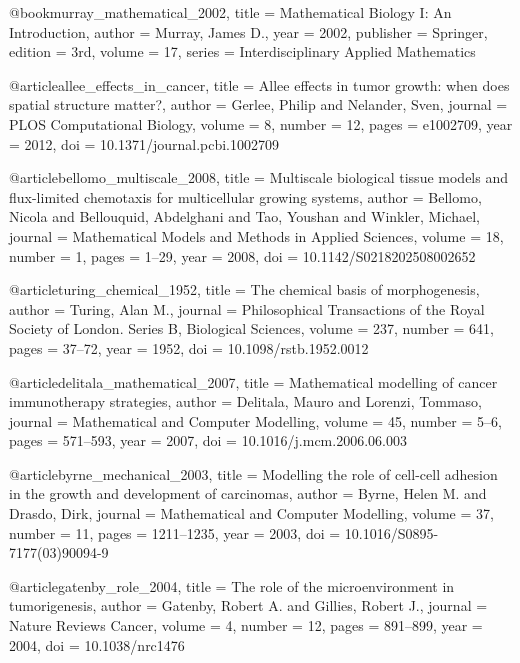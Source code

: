 @book{murray_mathematical_2002,
  title     = {Mathematical Biology I: An Introduction},
  author    = {Murray, James D.},
  year      = {2002},
  publisher = {Springer},
  edition   = {3rd},
  volume    = {17},
  series    = {Interdisciplinary Applied Mathematics}
}

@article{allee_effects_in_cancer,
  title   = {Allee effects in tumor growth: when does spatial structure matter?},
  author  = {Gerlee, Philip and Nelander, Sven},
  journal = {PLOS Computational Biology},
  volume  = {8},
  number  = {12},
  pages   = {e1002709},
  year    = {2012},
  doi     = {10.1371/journal.pcbi.1002709}
}

@article{bellomo_multiscale_2008,
  title   = {Multiscale biological tissue models and flux-limited chemotaxis for multicellular growing systems},
  author  = {Bellomo, Nicola and Bellouquid, Abdelghani and Tao, Youshan and Winkler, Michael},
  journal = {Mathematical Models and Methods in Applied Sciences},
  volume  = {18},
  number  = {1},
  pages   = {1--29},
  year    = {2008},
  doi     = {10.1142/S0218202508002652}
}

@article{turing_chemical_1952,
  title   = {The chemical basis of morphogenesis},
  author  = {Turing, Alan M.},
  journal = {Philosophical Transactions of the Royal Society of London. Series B, Biological Sciences},
  volume  = {237},
  number  = {641},
  pages   = {37--72},
  year    = {1952},
  doi     = {10.1098/rstb.1952.0012}
}

@article{delitala_mathematical_2007,
  title   = {Mathematical modelling of cancer immunotherapy strategies},
  author  = {Delitala, Mauro and Lorenzi, Tommaso},
  journal = {Mathematical and Computer Modelling},
  volume  = {45},
  number  = {5--6},
  pages   = {571--593},
  year    = {2007},
  doi     = {10.1016/j.mcm.2006.06.003}
}

@article{byrne_mechanical_2003,
  title   = {Modelling the role of cell-cell adhesion in the growth and development of carcinomas},
  author  = {Byrne, Helen M. and Drasdo, Dirk},
  journal = {Mathematical and Computer Modelling},
  volume  = {37},
  number  = {11},
  pages   = {1211--1235},
  year    = {2003},
  doi     = {10.1016/S0895-7177(03)90094-9}
}

@article{gatenby_role_2004,
  title   = {The role of the microenvironment in tumorigenesis},
  author  = {Gatenby, Robert A. and Gillies, Robert J.},
  journal = {Nature Reviews Cancer},
  volume  = {4},
  number  = {12},
  pages   = {891--899},
  year    = {2004},
  doi     = {10.1038/nrc1476}
}

